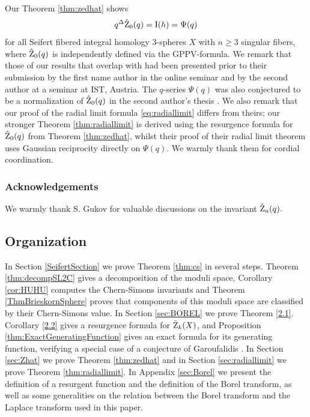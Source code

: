  Our Theorem \ref{thm:zedhat} shows 
 $$q^{\Delta}\hat{\operatorname{Z}}_0(q)=\operatorname{I}(h)=\Psi(q)$$ for all Seifert fibered integral homology $3$-spheres $X$ with $n\geq 3$ singular fibers, where $\hat{\operatorname{Z}}_0(q)$ is independently defined via the GPPV-formula. We remark that those of our results that overlap with \cite{Hiroyuki} had been presented prior to their submission by the first name author in the online seminar \cite{AndersenRes2020} and by the second author at a seminar \cite{MisteRes2020} at IST, Austria. The $q$-series $\Psi(q)$ was also conjectured to be a normalization of $\hat{\operatorname{Z}}_0(q)$ in the second author's thesis \cite{williamelbaekmistegardQuantumInvariantsChernSimons2019} . We also remark that our proof of the radial limit formula \eqref{eq:radiallimit} differs from theirs; our stronger Theorem \ref{thm:radiallimit} is derived using the resurgence formula for $\hat{\operatorname{Z}}_0(q)$ from Theorem \ref{thm:zedhat}, whilst their proof of their radial limit theorem uses Gaussian reciprocity directly on $\Psi(q)$. We warmly thank them for cordial coordination.
 

 
 \subsubsection*{Acknowledgements} We warmly thank S. Gukov for  valuable discussions on the invariant $\hat{\operatorname{Z}}_a(q).$ 
 
  
 
 \subsection*{Organization}
 
 In Section \ref{SeifertSection} we prove Theorem \ref{thm:cs} in several steps. Theorem \ref{thm:decompSL2C} gives a decomposition of the moduli space, Corollary \ref{cor:HUHU} computes the Chern-Simons invariants and Theorem \ref{ThmBrieskornSphere} proves that components of this moduli space are classified by their Chern-Simons value. In Section \ref{sec:BOREL} we prove Theorem \ref{2.1}. Corollary \ref{2.2} gives a resurgence formula for $\tilde{\operatorname{Z}}_k(X)$, and Proposition \ref{thm:ExactGeneratingFunction} gives an exact formula for its generating function, verifying a special case of a conjecture of Garoufalidis \cite{Garoufalidis08}. In Section \ref{sec:Zhat} we prove Theorem \ref{thm:zedhat} and  in Section \ref{sec:radiallimit} we prove Theorem \ref{thm:radiallimit}. In Appendix \ref{sec:Borel} we present the definition of a resurgent function and the definition of the Borel transform, as well as some generalities on the relation between the Borel transform and the Laplace transform used in this paper. 